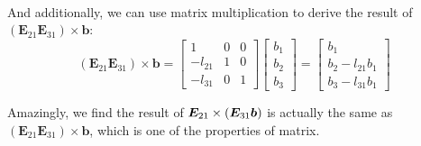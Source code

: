 \begin{example}
\begin{gather*}
\end{gather*}
And additionally, we can use matrix multiplication to derive the result of $(\bm E_{21}\bm E_{31})\times\bm b$:
\[
(\bm E_{21}\bm E_{31})\times\bm b=\begin{bmatrix}
1&0&0\\-l_{21}&1&0\\-l_{31}&0&1
\end{bmatrix}\begin{bmatrix}
b_1\\b_2\\b_3
\end{bmatrix}=\begin{bmatrix}
b_1\\b_2-l_{21}b_1\\b_3-l_{31}b_1
\end{bmatrix}
\]
\end{example}
Amazingly, we find the result of $\bm E_{21}\times(\bm E_{31}\bm b)$ is actually the same as $(\bm E_{21}\bm E_{31})\times\bm b$, which is one of the properties of matrix.
